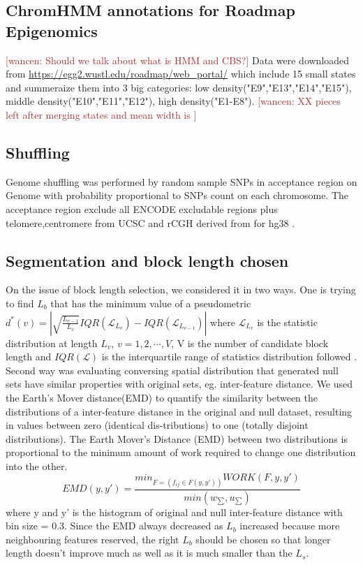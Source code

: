 \documentclass{article}
\newcommand{\wancen}[1]{\textcolor{Brown}{[wancen: #1]}}
\begin{document}
\subsection{ChromHMM annotations for Roadmap Epigenomics}
\wancen{Should we talk about what is HMM and CBS?}
Data were downloaded from \url{https://egg2.wustl.edu/roadmap/web_portal/} which include 15 small states and summeraize them into 3 big categories: low density("E9","E13","E14","E15"), middle density("E10","E11","E12"), high density("E1-E8"). \wancen{XX pieces left after merging states and mean width is }

\subsection{Shuffling}\label{sec:shuffle}
Genome shuffling was performed by random sample SNPs in acceptance region on Genome with probability proportional to SNPs count on each chromosome. The acceptance region exclude all ENCODE excludable regions plus telomere,centromere from UCSC and rCGH derived from  for hg38 \citep{excluderanges}.

\subsection{Segmentation and block length chosen}
On the issue of 
block length selection, we considered it in two ways. One is trying to find $L_b$ that has the minimum value of a pseudometric $d^*(v)=|\sqrt{\frac{L_{v-1}}{L_v}}IQR(\mathcal{L}_{L_v})-IQR(\mathcal{L}_{L_{v-1}})|$ where $\mathcal{L}_{L_v}$ is the statistic distribution at length $L_v$, $v=1,2,\cdots,V$, V is the number of candidate block length and $IQR(\mathcal{L})$ is the interquartile range of statistics distribution followed \citet{bickel2010subsampling}.
Second way was evaluating conversing spatial distribution that generated null sets have similar properties with original sets, eg. inter-feature distance. We used the Earth's Mover distance(EMD) to quantify the similarity between the distributions of a inter-feature distance in the original  and  null  dataset,  resulting  in  values  between  zero  (identical  dis-tributions)  to  one  (totally  disjoint  distributions). The Earth Mover's Distance (EMD) between two distributions is proportional to the minimum amount of work required to change one distribution into the other. $$EMD(y,y') = \frac{min_{F=(f_{ij}\in \mathcal{}F(y,y'))} WORK(F,y,y')}{min(w_{\sum},u_{\sum})}$$ where y and y' is the histogram of original and null inter-feature distance with bin size = 0.3. Since the EMD always decreased as $L_b$ increased because more neighbouring features reserved, the right $L_b$ should be chosen so that longer length doesn’t improve much as well as it is much smaller than the $L_s$.
\end{document}
